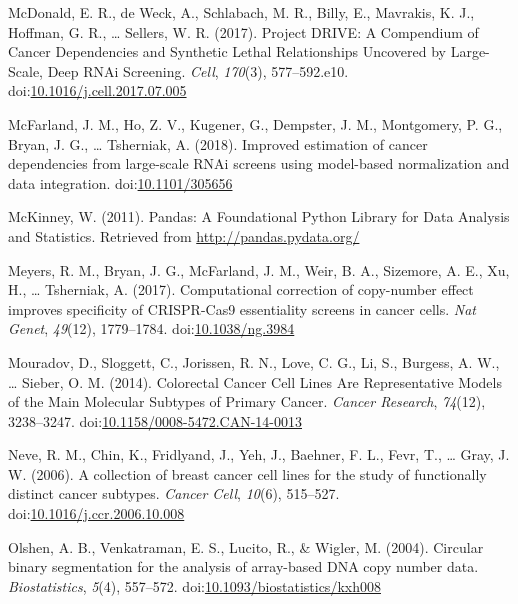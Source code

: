 \documentclass[man,floatsintext]{apa6}
\begin{document}
\hypertarget{ref-mcdonald2017}{}
McDonald, E. R., de Weck, A., Schlabach, M. R., Billy, E., Mavrakis, K.
J., Hoffman, G. R., \ldots{} Sellers, W. R. (2017). Project DRIVE: A
Compendium of Cancer Dependencies and Synthetic Lethal Relationships
Uncovered by Large-Scale, Deep RNAi Screening. \emph{Cell},
\emph{170}(3), 577--592.e10.
doi:\href{https://doi.org/10.1016/j.cell.2017.07.005}{10.1016/j.cell.2017.07.005}

\hypertarget{ref-mcfarland2018}{}
McFarland, J. M., Ho, Z. V., Kugener, G., Dempster, J. M., Montgomery,
P. G., Bryan, J. G., \ldots{} Tsherniak, A. (2018). Improved estimation
of cancer dependencies from large-scale RNAi screens using model-based
normalization and data integration.
doi:\href{https://doi.org/10.1101/305656}{10.1101/305656}

\hypertarget{ref-mckinney2011}{}
McKinney, W. (2011). Pandas: A Foundational Python Library for Data
Analysis and Statistics. Retrieved from \url{http://pandas.pydata.org/}

\hypertarget{ref-meyers2017}{}
Meyers, R. M., Bryan, J. G., McFarland, J. M., Weir, B. A., Sizemore, A.
E., Xu, H., \ldots{} Tsherniak, A. (2017). Computational correction of
copy-number effect improves specificity of CRISPR-Cas9 essentiality
screens in cancer cells. \emph{Nat Genet}, \emph{49}(12), 1779--1784.
doi:\href{https://doi.org/10.1038/ng.3984}{10.1038/ng.3984}

\hypertarget{ref-mouradov2014}{}
Mouradov, D., Sloggett, C., Jorissen, R. N., Love, C. G., Li, S.,
Burgess, A. W., \ldots{} Sieber, O. M. (2014). Colorectal Cancer Cell
Lines Are Representative Models of the Main Molecular Subtypes of
Primary Cancer. \emph{Cancer Research}, \emph{74}(12), 3238--3247.
doi:\href{https://doi.org/10.1158/0008-5472.CAN-14-0013}{10.1158/0008-5472.CAN-14-0013}

\hypertarget{ref-neve2006}{}
Neve, R. M., Chin, K., Fridlyand, J., Yeh, J., Baehner, F. L., Fevr, T.,
\ldots{} Gray, J. W. (2006). A collection of breast cancer cell lines
for the study of functionally distinct cancer subtypes. \emph{Cancer
Cell}, \emph{10}(6), 515--527.
doi:\href{https://doi.org/10.1016/j.ccr.2006.10.008}{10.1016/j.ccr.2006.10.008}

\hypertarget{ref-olshen2004}{}
Olshen, A. B., Venkatraman, E. S., Lucito, R., \& Wigler, M. (2004).
Circular binary segmentation for the analysis of array-based DNA copy
number data. \emph{Biostatistics}, \emph{5}(4), 557--572.
doi:\href{https://doi.org/10.1093/biostatistics/kxh008}{10.1093/biostatistics/kxh008}
\end{document}
